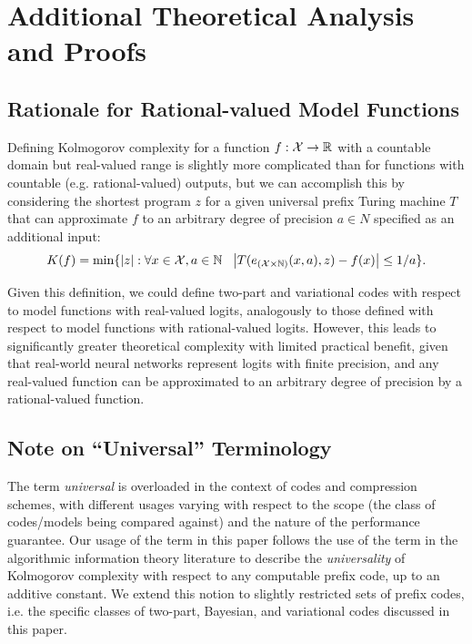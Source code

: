 \section{Additional Theoretical Analysis and Proofs}
\label{sec:appendix-theory}

\subsection{Rationale for Rational-valued Model Functions}
\label{sec:real-valued-distributions}

Defining Kolmogorov complexity for a function $f: {\mathcal{X}} \rightarrow \mathbb{R}$ with a countable domain but real-valued range is slightly more complicated than for functions with countable (e.g. rational-valued) outputs, but we can accomplish this by considering the shortest program $z$ for a given universal prefix Turing machine $T$ that can approximate $f$ to an arbitrary degree of precision $a \in N$ specified as an additional input:
\begin{equation}
    K(f) = \min \{|z| : \forall x \in {\mathcal{X}},a \in \mathbb{N}~~ \left| T(e_{({\mathcal{X}} \times \mathbb{N})}(x,a),z) - f(x) \right| \leq 1 / a \}.
\label{eq:kolmogorov-real-valued-function}
\end{equation}

Given this definition, we could define two-part and variational codes with respect to model functions with real-valued logits, analogously to those defined with respect to model functions with rational-valued logits. However, this leads to significantly greater theoretical complexity with limited practical benefit, given that real-world neural networks represent logits with finite precision, and any real-valued function can be approximated to an arbitrary degree of precision by a rational-valued function.

\subsection{Note on ``Universal'' Terminology}
\label{sec:universal-terminology}

The term \emph{universal} is overloaded in the context of codes and compression schemes, with different usages varying with respect to the scope (the class of codes/models being compared against) and the nature of the performance guarantee. Our usage of the term in this paper follows the use of the term in the algorithmic information theory literature to describe the \emph{universality} of Kolmogorov complexity with respect to any computable prefix code, up to an additive constant. We extend this notion to slightly restricted sets of prefix codes, i.e. the specific classes of two-part, Bayesian, and variational codes discussed in this paper.

